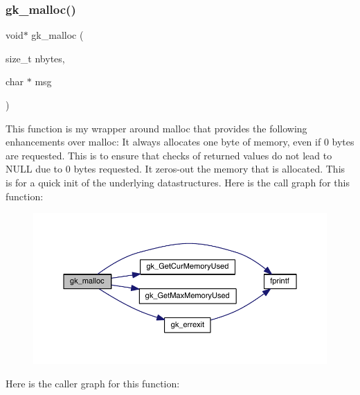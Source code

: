 \subsubsection{\texorpdfstring{gk\+\_\+malloc()}{gk\_malloc()}}
{\footnotesize\ttfamily void$\ast$ gk\+\_\+malloc (\begin{DoxyParamCaption}\item[{size\+\_\+t}]{nbytes,  }\item[{char $\ast$}]{msg }\end{DoxyParamCaption})}

This function is my wrapper around malloc that provides the following enhancements over malloc\+: It always allocates one byte of memory, even if 0 bytes are requested. This is to ensure that checks of returned values do not lead to N\+U\+LL due to 0 bytes requested. It zeros-\/out the memory that is allocated. This is for a quick init of the underlying datastructures. Here is the call graph for this function\+:\nopagebreak
\begin{figure}[H]
\begin{center}
\leavevmode
\includegraphics[width=350pt]{a00077_aba6f76f5c67b9b7e9c2e45988d3d3e9d_cgraph}
\end{center}
\end{figure}
Here is the caller graph for this function\+:\nopagebreak
